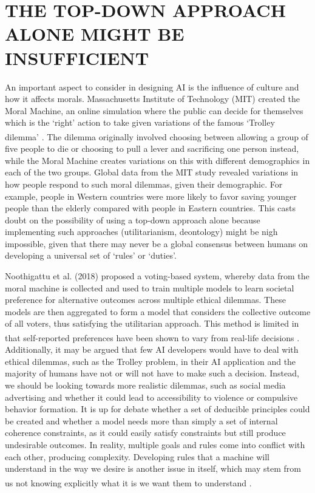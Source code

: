 \documentclass[10pt]{article}
\begin{document}
\section{THE TOP-DOWN APPROACH ALONE MIGHT BE INSUFFICIENT}


An important aspect to consider in designing AI is the influence of culture and how it affects morals. Massachusetts Institute of Technology (MIT) created the Moral Machine, an online simulation where the public can decide for themselves which is the ‘right’ action to take given variations of the famous ‘Trolley dilemma’ \textsuperscript{\cite{awad_moral_2018}}. The dilemma originally involved choosing between allowing a group of five people to die or choosing to pull a lever
and sacrificing one person instead, while the Moral Machine creates variations on this with different demographics
in each of the two groups. Global data from the MIT study revealed variations in how people respond to such moral dilemmas, given their demographic. For example, people in Western countries were more likely to favor saving younger people than the elderly compared with people in Eastern countries. This casts doubt on the possibility of using a top-down approach alone because implementing such approaches (utilitarianism, deontology) might be nigh impossible, given that there may never be a global consensus between humans on developing a universal set of ‘rules’ or ‘duties’.

Noothigattu et al. (2018) proposed a voting-based system, whereby data from the moral machine is collected and used to train multiple models to learn societal preference for alternative outcomes across multiple ethical dilemmas. These models are then aggregated to form a model that considers the collective outcome of all voters, thus satisfying the utilitarian approach. This method is limited in that self-reported preferences have been shown to vary from real-life decisions \textsuperscript{\cite{noothigattu_voting-based_2018}}. Additionally, it may be argued that few AI developers would have to deal with ethical dilemmas, such as the Trolley problem, in their AI application and the majority of humans have not or will not have to make such a decision. Instead, we should be looking towards more realistic dilemmas, such as social media advertising and whether it could lead to accessibility to violence or compulsive behavior formation. It is up for debate whether a set of deducible principles could be created and whether a model needs more than simply a set of internal coherence constraints, as it could easily satisfy constraints but still produce undesirable outcomes. In reality, multiple goals and rules come into conflict with each other, producing complexity. Developing rules that a machine will understand in the way we desire is another issue in itself, which may stem from us not knowing explicitly what it is we want them to understand  \textsuperscript{\cite{badea_morality_2022}}. 
\end{document}
